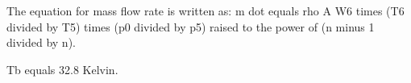 The equation for mass flow rate is written as:  
m dot equals rho A W6 times (T6 divided by T5) times (p0 divided by p5) raised to the power of (n minus 1 divided by n).  

Tb equals 32.8 Kelvin.